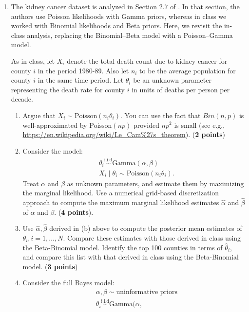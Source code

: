 \documentclass{scrartcl}
\begin{document}
\begin{enumerate}
\item The kidney cancer dataset is analyzed in Section 2.7 of
  \citet{Gelman2013}. In that section, the authors use Poisson
  likelihoods with Gamma priors, whereas in class we worked with
  Binomial likelihoods and Beta priors. Here, we revisit the in-class
  analysis, replacing the Binomial–Beta model with a Poisson–Gamma
  model.

  As in class, let $X_i$ denote the total death count due to kidney
  cancer for county $i$ in the period 1980-89. Also let $n_i$ to be
  the average population for county $i$ in the same time period. Let
  $\theta_i$ be an unknown parameter representing the death rate for
  county $i$ in units of deaths per person per decade. 

  \begin{enumerate}
  \item Argue that $X_i \sim \text{Poisson}(n_i \theta_i)$. You can
    use the fact that $Bin(n, p)$ is well-approximated by
    $\text{Poisson}(np)$ provided $np^2$ is small (see e.g.,
    \url{https://en.wikipedia.org/wiki/Le_Cam\%27s_theorem}). (\textbf{2
      points})
  \item Consider the model:
    \begin{align*}
    &  \theta_i \overset{\text{i.i.d}}{\sim} \text{Gamma}(\alpha,
      \beta) \\
& X_i \mid \theta_i \sim \text{Poisson}(n_i \theta_i). 
    \end{align*}
    Treat $\alpha$ and $\beta$ as unknown parameters, and estimate
    them by maximizing the marginal likelihood. Use a numerical
    grid-based discretization approach to compute the maximum marginal
    likelihood estimates $\hat{\alpha}$ and $\hat{\beta}$ of $\alpha$
    and $\beta$. (\textbf{4 points}).
  \item Use $\hat{\alpha}, \hat{\beta}$ derived in (b) above to
    compute the posterior mean estimates of $\theta_i, i = 1, \dots,
    N$. Compare these estimates with those derived in class using the
    Beta-Binomial model. Identify the top 100 counties in terms of
    $\hat{\theta}_i$, and compare this list with that derived in class using the
    Beta-Binomial model. (\textbf{3 points})
  \item Consider the full Bayes model:
    \begin{equation}\label{fullBayes}
      \begin{split}
  & \alpha, \beta \sim \text{uninformative priors} \\
    &  \theta_i \overset{\text{i.i.d}}{\sim} \text{Gamma}(\alpha,

\end{split}
\end{equation}
\end{enumerate}
\end{enumerate}
\end{document}
